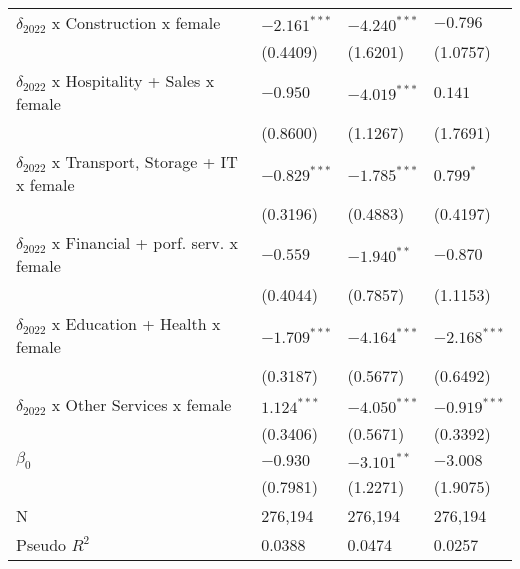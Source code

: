 \begin{tabular}{llll}
$\delta_{2022}$ x Construction x female            &     $-2.161^{***}$ &     $-4.240^{***}$ &           $-0.796$ \\
                                                   &           (0.4409) &           (1.6201) &           (1.0757) \\
$\delta_{2022}$ x Hospitality + Sales x female     &           $-0.950$ &     $-4.019^{***}$ &            $0.141$ \\
                                                   &           (0.8600) &           (1.1267) &           (1.7691) \\
$\delta_{2022}$ x Transport, Storage + IT x female &     $-0.829^{***}$ &     $-1.785^{***}$ &          $0.799^*$ \\
                                                   &           (0.3196) &           (0.4883) &           (0.4197) \\
$\delta_{2022}$ x Financial + porf. serv. x female &           $-0.559$ &      $-1.940^{**}$ &           $-0.870$ \\
                                                   &           (0.4044) &           (0.7857) &           (1.1153) \\
$\delta_{2022}$ x Education + Health x female      &     $-1.709^{***}$ &     $-4.164^{***}$ &     $-2.168^{***}$ \\
                                                   &           (0.3187) &           (0.5677) &           (0.6492) \\
$\delta_{2022}$ x Other Services x female          &      $1.124^{***}$ &     $-4.050^{***}$ &     $-0.919^{***}$ \\
                                                   &           (0.3406) &           (0.5671) &           (0.3392) \\
$\beta_0$                                          &           $-0.930$ &      $-3.101^{**}$ &           $-3.008$ \\
                                                   &           (0.7981) &           (1.2271) &           (1.9075) \\
N                                                  &            276,194 &            276,194 &            276,194 \\
Pseudo $R^2$                                       &             0.0388 &             0.0474 &             0.0257 \\
\bottomrule
\end{tabular}
